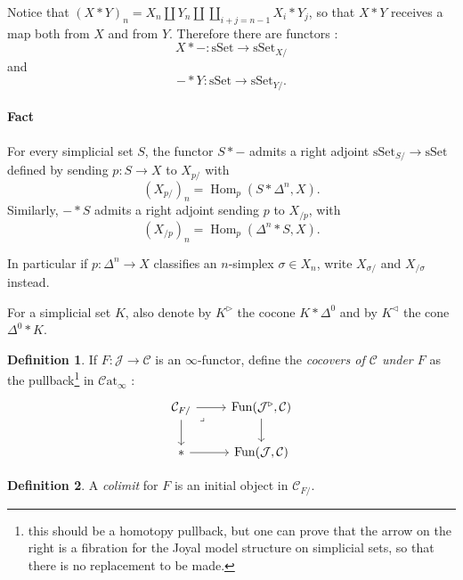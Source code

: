 \documentclass[11pt]{article}
\theoremstyle{definition}
\newtheorem{definition}{Definition}
\newcommand{\C}{\mathcal{C}}
\newcommand{\Catinf}{\mathcal{C}\mathrm{at}_{\infty}}
\newcommand{\Fun}{\operatorname{Fun}}
\newcommand{\Hom}{\operatorname{Hom}}
\newcommand{\J}{\mathcal{J}}
\newcommand{\sSet}{\mathrm{sSet}}
\begin{document}
Notice that $(X \ast Y)_n = X_n \amalg Y_n \amalg \coprod_{i + j = n - 1} X_i \ast Y_j$, so that $X \ast Y$ receives a map both from $X$ and from $Y$. Therefore there are functors :
\[
    X \ast - : \sSet \to \sSet_{X/}
\]
and
\[
    - \ast Y : \sSet \to \sSet_{Y/}.
\]

\paragraph{Fact} For every simplicial set $S$, the functor $S \ast -$ admits a right adjoint $\sSet_{S/} \to \sSet$ defined by sending $p : S \to X$ to $X_{p/}$ with
\[
    (X_{p/})_n = \Hom_p(S \ast \Delta^n, X).
\]
Similarly, $- \ast S$ admits a right adjoint sending $p$ to $X_{/p}$, with
\[
    (X_{/p})_n = \Hom_p(\Delta^n \ast S, X).
\]

In particular if $p : \Delta^n \to X$ classifies an $n$-simplex $\sigma \in X_n$, write $X_{\sigma/}$ and $X_{/\sigma}$ instead.

For a simplicial set $K$, also denote by $K^{\triangleright}$ the cocone $K \ast \Delta^0$ and by $K^{\triangleleft}$ the cone $\Delta^0 \ast K$.

\begin{definition}
    If $F : \J \to \C$ is an $\infty$-functor, define the \emph{cocovers of $\C$ under $F$} as the pullback\footnote{this should be a homotopy pullback, but one can prove that the arrow on the right is a fibration for the Joyal model structure on simplicial sets, so that there is no replacement to be made.} in $\Catinf$ :
    \[\begin{tikzcd}
        {\C_{F/}} & {\Fun(\J^{\triangleright}, \C)} \\
        \ast & {\Fun(\J, \C)}
        \arrow[from=1-1, to=1-2]
        \arrow[from=1-1, to=2-1]
        \arrow["\lrcorner"{anchor=center, pos=0.125}, draw=none, from=1-1, to=2-2]
        \arrow[from=1-2, to=2-2]
        \arrow[from=2-1, to=2-2]
    \end{tikzcd}\]
\end{definition}

\begin{definition}
    A \emph{colimit} for $F$ is an initial object in $\C_{F/}$.
\end{definition}
\end{document}
